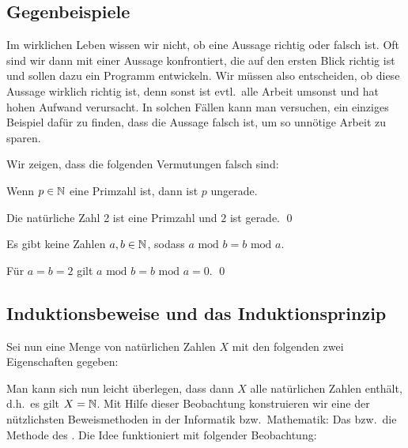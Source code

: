\subsection{Gegenbeispiele}
Im wirklichen Leben wissen wir nicht, ob eine Aussage richtig oder
falsch ist. Oft sind wir dann mit einer Aussage konfrontiert, die auf
den ersten Blick richtig ist und sollen dazu ein Programm
entwickeln. Wir müssen also entscheiden, ob diese Aussage wirklich
richtig ist, denn sonst ist evtl.~alle Arbeit umsonst und hat hohen
Aufwand verursacht. In solchen Fällen kann man versuchen, ein einziges
Beispiel dafür zu finden, dass die Aussage falsch ist, um so unnötige
Arbeit zu sparen.

\bigskip

\noindent Wir zeigen, dass die folgenden Vermutungen falsch sind:
\begin{conjecture}
Wenn $p \in \mathbb N$ eine Primzahl ist, dann ist $p$ ungerade.
\end{conjecture}

\begin{counterexample}
Die natürliche Zahl 2 ist eine Primzahl und $2$ ist gerade. \qed
\end{counterexample}

\begin{conjecture}
Es gibt keine Zahlen $a,b \in \mathbb N$, sodass $a \textrm{ mod } b = b
\textrm{ mod } a$.
\end{conjecture}

\begin{counterexample}
Für $a = b = 2$ gilt $a \textrm{ mod } b = b \textrm{ mod } a = 0$. \qed
\end{counterexample}

\subsection{Induktionsbeweise und das Induktionsprinzip}

Sei nun eine Menge von natürlichen Zahlen $X$ mit den folgenden zwei Eigenschaften
gegeben:

\medskip


\medskip

Man kann sich nun leicht überlegen, dass dann $X$ alle natürlichen Zahlen enthält, d.h.~es 
gilt $X = \mathbb N$. Mit Hilfe dieser Beobachtung konstruieren wir eine der nützlichsten 
Beweismethoden in der Informatik bzw.~Mathematik: Das  
bzw.~die Methode des . Die Idee funktioniert mit folgender
Beobachtung:


